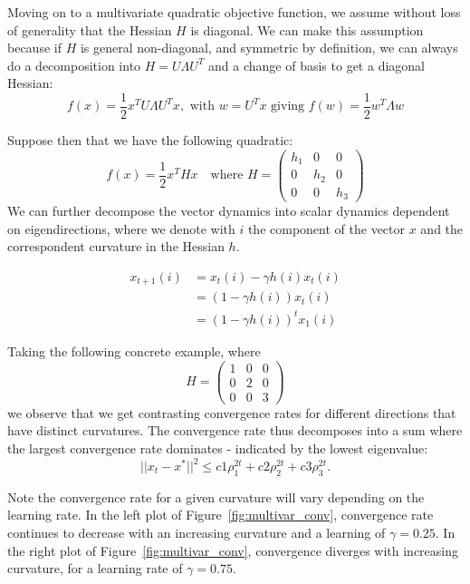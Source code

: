 \documentclass{article}
\begin{document}
Moving on to a multivariate quadratic objective function, we assume without loss of generality that the Hessian $H$ is diagonal.
We can make this assumption because if $H$ is general non-diagonal, and symmetric by definition, we can always do a decomposition into $H = U\Lambda U^T$ and a change of basis to get a diagonal Hessian:
\begin{equation}
    f(x) = \frac{1}{2} x^T U \Lambda U^T x, \text{ with } w=U^T x \text{ giving } f(w) = \frac{1}{2} w^T \Lambda w
\end{equation}

Suppose then that we have the following quadratic:
\begin{equation}
f(x) = \frac{1}{2} x^T H x \quad \text{where } H = \begin{pmatrix} h_1&0&0\\0&h_2&0\\0&0&h_3\end{pmatrix}
\end{equation}
We can further decompose the vector dynamics into scalar dynamics dependent on eigendirections, where we denote with $i$ the component of the vector $x$ and the correspondent curvature in the Hessian $h$. 

\begin{align*}
	x_{t+1}(i) &= x_t(i) -\gamma h(i) x_t(i) \\
            &=(1 - \gamma h(i)) x_t(i) \\
            &=(1 - \gamma h(i))^t x_1(i)
\end{align*}

Taking the following concrete example, where 
\begin{equation}
H = \begin{pmatrix} 1&0&0\\0&2&0\\0&0&3\end{pmatrix}
\end{equation}
we observe that we get contrasting convergence rates for different directions that have distinct curvatures. The convergence rate thus decomposes into a sum where the largest convergence rate dominates - indicated by the lowest eigenvalue:
\begin{equation}
||x_t - x^*||^2 \leq c1 \rho_1^{2t} + c2 \rho_2^{2t} + c3 \rho_3^{2t}.
\end{equation}

Note the convergence rate for a given curvature will vary depending on the learning rate. In the left plot of Figure~\ref{fig:multivar_conv}, convergence rate continues to decrease with an increasing curvature and a learning of $\gamma = 0.25$. In the right plot of Figure~\ref{fig:multivar_conv}, convergence diverges with increasing curvature, for a learning rate of $\gamma=0.75$.
\end{document}
